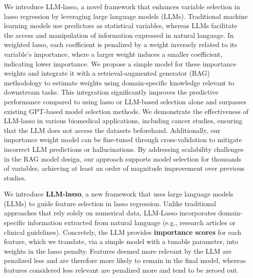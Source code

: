 We introduce LLM-lasso, a novel framework that enhances variable selection in lasso regression by leveraging large language models (LLMs). Traditional machine learning models use predictors as statistical variables, whereas LLMs facilitate the access and manipulation of information expressed in natural language. In weighted lasso, each coefficient is penalized by a weight inversely related to its variable's importance, where a larger weight induces a smaller coefficient, indicating lower importance. We propose a simple model for these importance weights and integrate it with a retrieval-augmented generator (RAG) methodology to estimate weights using domain-specific knowledge relevant to downstream tasks. This integration significantly improves the predictive performance compared to using lasso or LLM-based selection alone and surpasses existing GPT-based model selection methods. We demonstrate the effectiveness of LLM-lasso in various biomedical applications, including cancer studies, ensuring that the LLM does not access the datasets beforehand. Additionally, our importance weight model can be fine-tuned through cross-validation to mitigate incorrect LLM predictions or hallucinations. By addressing scalability challenges in the RAG model design, our approach supports model selection for thousands of variables, achieving at least an order of magnitude improvement over previous studies.


We introduce \textbf{LLM-lasso}, a new framework that uses large language models (LLMs) to guide feature selection in lasso regression. Unlike traditional approaches that rely solely on numerical data, LLM-Lasso incorporates domain-specific information extracted from natural language (e.g., research articles or clinical guidelines). Concretely, the LLM provides \textbf{importance scores} for each feature, which we translate, via a simple model with a tunable parameter, into weights in the lasso penalty. Features deemed more relevant by the LLM are penalized less and are therefore more likely to remain in the final model, whereas features considered less relevant are penalized more and tend to be zeroed out.

